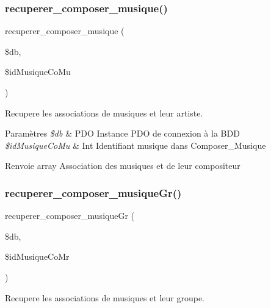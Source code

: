 \subsubsection{\texorpdfstring{recuperer\+\_\+composer\+\_\+musique()}{recuperer\_composer\_musique()}}
{\footnotesize\ttfamily recuperer\+\_\+composer\+\_\+musique (\begin{DoxyParamCaption}\item[{}]{\$db,  }\item[{}]{\$id\+Musique\+Co\+Mu }\end{DoxyParamCaption})}



Recupere les associations de musiques et leur artiste. 


\begin{DoxyParams}{Paramètres}
{\em \$db} & P\+DO Instance P\+DO de connexion à la B\+DD \\
\hline
{\em \$id\+Musique\+Co\+Mu} & Int Identifiant musique dans Composer\+\_\+\+Musique \\
\hline
\end{DoxyParams}
\begin{DoxyReturn}{Renvoie}
array Association des musiques et de leur compositeur 
\end{DoxyReturn}
\mbox{\label{fonctionMusique_8php_a4ca358b5f3211b09e03236b8cc99c8a9}} 
\subsubsection{\texorpdfstring{recuperer\+\_\+composer\+\_\+musique\+Gr()}{recuperer\_composer\_musiqueGr()}}
{\footnotesize\ttfamily recuperer\+\_\+composer\+\_\+musique\+Gr (\begin{DoxyParamCaption}\item[{}]{\$db,  }\item[{}]{\$id\+Musique\+Co\+Mr }\end{DoxyParamCaption})}



Recupere les associations de musiques et leur groupe. 



